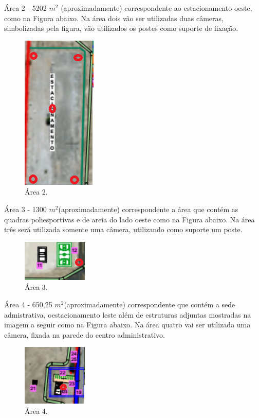 	Área 2 - 5202 $m^{2}$ (aproximadamente) correspondente ao estacionamento oeste, como na Figura abaixo. Na área dois vão ser utilizadas duas câmeras, simbolizadas pela figura, vão utilizados os postes como suporte de fixação.
	
	
\begin{figure}[H]
	 \centering
	\label{Área 2}
	 \includegraphics[keepaspectratio=true,scale=0.8]{monitoramento/2.png}
	 \caption{Área 2.}
\end{figure}
	
	Área 3 - 1300 $m^{2}$(aproximadamente) correspondente a área que contém as quadras poliesportivas e de areia do lado oeste como na Figura abaixo. Na área três ser\'a utilizada somente uma câmera, utilizando como suporte um poste.
	
\begin{figure}[H]
	 \centering
	\label{Área 3}
	 \includegraphics[keepaspectratio=true,scale=0.8]{monitoramento/3.png}
	 \caption{Área 3.}
\end{figure}

Área 4 - 650,25 $m^{2}$(aproximadamente) correspondente que contém a sede admistrativa, oestacionamento  leste além de estruturas adjuntas mostradas na imagem a seguir como na Figura abaixo. Na área quatro vai ser utilizada uma câmera, fixada na parede do centro administrativo.

\begin{figure}[H]
	 \centering
	\label{Área 4}
	 \includegraphics[keepaspectratio=true,scale=0.8]{monitoramento/4.png}
	 \caption{Área 4.}
\end{figure}

